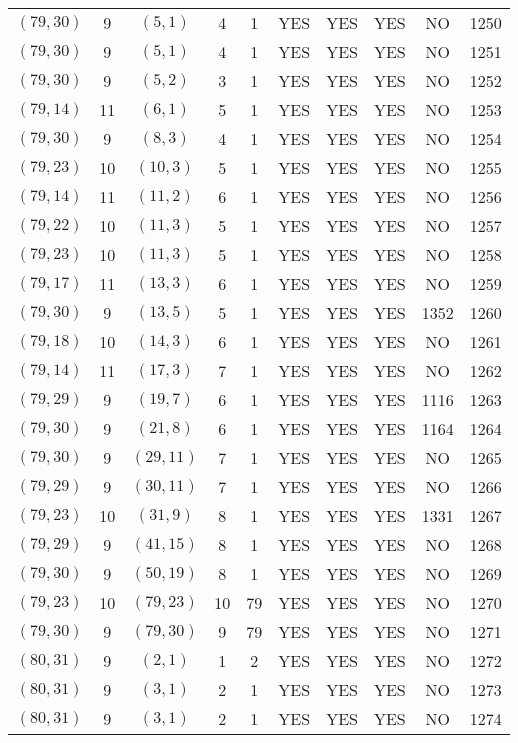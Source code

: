 \begin{longtable}{|c|c|c|c|c|c|c|c|c|c|}
$(79, 30)$ & 9 & $(5, 1)$ & 4 & 1 & YES & YES & YES & NO & 1250\\
$(79, 30)$ & 9 & $(5, 1)$ & 4 & 1 & YES & YES & YES & NO & 1251\\
$(79, 30)$ & 9 & $(5, 2)$ & 3 & 1 & YES & YES & YES & NO & 1252\\
$(79, 14)$ & 11 & $(6, 1)$ & 5 & 1 & YES & YES & YES & NO & 1253\\
$(79, 30)$ & 9 & $(8, 3)$ & 4 & 1 & YES & YES & YES & NO & 1254\\
$(79, 23)$ & 10 & $(10, 3)$ & 5 & 1 & YES & YES & YES & NO & 1255\\
$(79, 14)$ & 11 & $(11, 2)$ & 6 & 1 & YES & YES & YES & NO & 1256\\
$(79, 22)$ & 10 & $(11, 3)$ & 5 & 1 & YES & YES & YES & NO & 1257\\
$(79, 23)$ & 10 & $(11, 3)$ & 5 & 1 & YES & YES & YES & NO & 1258\\
$(79, 17)$ & 11 & $(13, 3)$ & 6 & 1 & YES & YES & YES & NO & 1259\\
$(79, 30)$ & 9 & $(13, 5)$ & 5 & 1 & YES & YES & YES & 1352 & 1260\\
$(79, 18)$ & 10 & $(14, 3)$ & 6 & 1 & YES & YES & YES & NO & 1261\\
$(79, 14)$ & 11 & $(17, 3)$ & 7 & 1 & YES & YES & YES & NO & 1262\\
$(79, 29)$ & 9 & $(19, 7)$ & 6 & 1 & YES & YES & YES & 1116 & 1263\\
$(79, 30)$ & 9 & $(21, 8)$ & 6 & 1 & YES & YES & YES & 1164 & 1264\\
$(79, 30)$ & 9 & $(29, 11)$ & 7 & 1 & YES & YES & YES & NO & 1265\\
$(79, 29)$ & 9 & $(30, 11)$ & 7 & 1 & YES & YES & YES & NO & 1266\\
$(79, 23)$ & 10 & $(31, 9)$ & 8 & 1 & YES & YES & YES & 1331 & 1267\\
$(79, 29)$ & 9 & $(41, 15)$ & 8 & 1 & YES & YES & YES & NO & 1268\\
$(79, 30)$ & 9 & $(50, 19)$ & 8 & 1 & YES & YES & YES & NO & 1269\\
$(79, 23)$ & 10 & $(79, 23)$ & 10 & 79 & YES & YES & YES & NO & 1270\\
$(79, 30)$ & 9 & $(79, 30)$ & 9 & 79 & YES & YES & YES & NO & 1271\\
$(80, 31)$ & 9 & $(2, 1)$ & 1 & 2 & YES & YES & YES & NO & 1272\\
$(80, 31)$ & 9 & $(3, 1)$ & 2 & 1 & YES & YES & YES & NO & 1273\\
$(80, 31)$ & 9 & $(3, 1)$ & 2 & 1 & YES & YES & YES & NO & 1274\\

\end{longtable}
